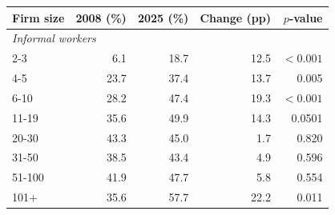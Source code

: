 \begin{tabular}{lrrrr}
\toprule
    Firm size & 2008 (\%) & 2025 (\%) & Change (pp) & $p$-value \\
    \midrule
\multicolumn{5}{l}{\textit{Informal workers}} \\
2-3 & 6.1 & 18.7 & 12.5 & $<0.001$ \\
4-5 & 23.7 & 37.4 & 13.7 & 0.005 \\
6-10 & 28.2 & 47.4 & 19.3 & $<0.001$ \\
11-19 & 35.6 & 49.9 & 14.3 & 0.0501 \\
20-30 & 43.3 & 45.0 & 1.7 & 0.820 \\
31-50 & 38.5 & 43.4 & 4.9 & 0.596 \\
51-100 & 41.9 & 47.7 & 5.8 & 0.554 \\
101+ & 35.6 & 57.7 & 22.2 & 0.011\\
\bottomrule\end{tabular}
